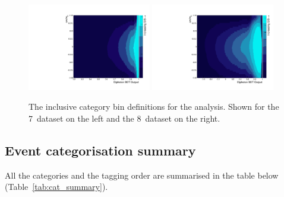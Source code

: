 \begin{figure}
  \includegraphics[width=0.48\textwidth]{selec_and_cats/plots/sideband_cats_7TeV.pdf}
  \includegraphics[width=0.48\textwidth]{selec_and_cats/plots/sideband_cats_8TeV.pdf}
  \caption{The inclusive category bin definitions for the \SMVA analysis. Shown for the 7~\TeV dataset on the left and the 8~\TeV dataset on the right.}
  \label{fig:sideband_cats}
\end{figure}

\subsection{Event categorisation summary}

All the categories and the tagging order are summarised in the table below (Table~\ref{tab:cat_summary}).

